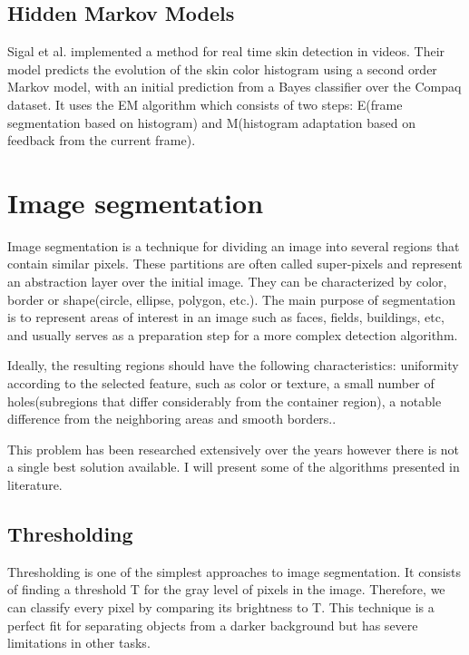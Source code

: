 \documentclass[12pt]{report}
\begin{document}
 	\subsection{Hidden Markov Models}
 	Sigal et al.\cite{hmm} implemented a method for real time skin detection in videos. Their model predicts the evolution of the skin color histogram using a second order Markov model, with an initial prediction from a Bayes classifier over the Compaq dataset. It uses the EM algorithm which consists of two steps: E(frame segmentation based on histogram) and M(histogram adaptation based on feedback from the current frame).
 	
	\section{Image segmentation}
	Image segmentation is a technique for dividing an image into several regions that contain similar pixels. These partitions are often called super-pixels and represent an abstraction layer over the initial image. They can be characterized by color, border or shape(circle, ellipse, polygon, etc.)\cite{computer_vision_book}. The main purpose of segmentation is to represent areas of interest in an image such as faces, fields, buildings, etc, and usually serves as a preparation step for a more complex detection algorithm.
	
	Ideally, the resulting regions should have the following characteristics: uniformity according to the selected feature, such as color or texture, a small number of holes(subregions that differ considerably from the container region), a notable difference from the neighboring areas and smooth borders.\cite{computer_vision_book}.
	
	This problem has been researched extensively over the years however there is not a single best solution available. I will present some of the algorithms presented in literature.
	
	\subsection{Thresholding}
	Thresholding is one of the simplest approaches to image segmentation. It consists of finding a threshold T for the gray level of pixels in the image. Therefore, we can classify every pixel by comparing its brightness to T. This technique is a perfect fit for separating objects from a darker background but has severe limitations in other tasks\cite{image_segmentation_techniques}.
	
\end{document}
